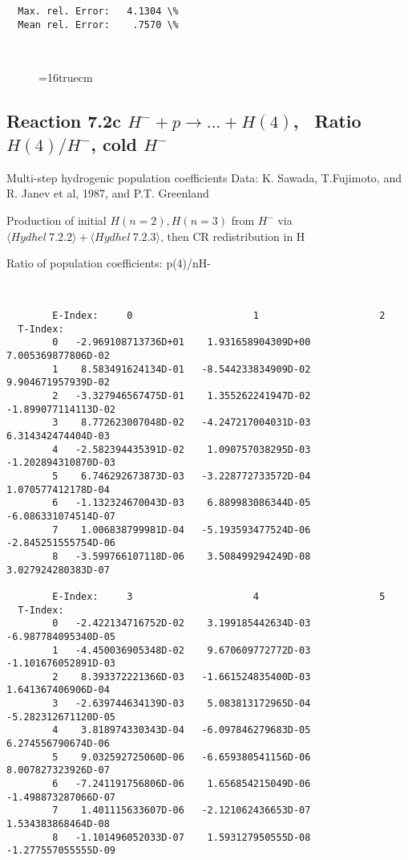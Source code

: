 \documentclass[12pt,dvipdfmx]{article}
\begin{document}
{\begin{small}
\begin{verbatim}
  Max. rel. Error:   4.1304 \%
  Mean rel. Error:    .7570 \%



\end{verbatim}\end{small}
\begin{figure} \label{7.2b}
\epsfxsize=16truecm
\end{figure}
\newpage

\subsection{
Reaction 7.2c $ H^- + p \rightarrow ...+ H(4) $, \   Ratio $H(4)/H^- $, cold $H^-$
}

 Multi-step hydrogenic population coefficients
 Data: K. Sawada, T.Fujimoto, \cite{kn:Sawada} and R. Janev et al, 1987, and P.T. Greenland

Production of initial $H(n=2), H(n=3)$ from $H^-$ via $ \langle Hydhel~ 7.2.2\rangle + \langle Hydhel~ 7.2.3\rangle$,
 then CR redistribution in H

 Ratio of population coefficients: p(4)/nH-

\begin{small}\begin{verbatim}


        E-Index:     0                     1                     2
  T-Index:
        0   -2.969108713736D+01    1.931658904309D+00    7.005369877806D-02
        1    8.583491624134D-01   -8.544233834909D-02    9.904671957939D-02
        2   -3.327946567475D-01    1.355262241947D-02   -1.899077114113D-02
        3    8.772623007048D-02   -4.247217004031D-03    6.314342474404D-03
        4   -2.582394435391D-02    1.090757038295D-03   -1.202894310870D-03
        5    6.746292673873D-03   -3.228772733572D-04    1.070577412178D-04
        6   -1.132324670043D-03    6.889983086344D-05   -6.086331074514D-07
        7    1.006838799981D-04   -5.193593477524D-06   -2.845251555754D-06
        8   -3.599766107118D-06    3.508499294249D-08    3.027924280383D-07

        E-Index:     3                     4                     5
  T-Index:
        0   -2.422134716752D-02    3.199185442634D-03   -6.987784095340D-05
        1   -4.450036905348D-02    9.670609772772D-03   -1.101676052891D-03
        2    8.393372221366D-03   -1.661524835400D-03    1.641367406906D-04
        3   -2.639744634139D-03    5.083813172965D-04   -5.282312671120D-05
        4    3.818974330343D-04   -6.097846279683D-05    6.274556790674D-06
        5    9.032592725060D-06   -6.659380541156D-06    8.007827323926D-07
        6   -7.241191756806D-06    1.656854215049D-06   -1.498873287066D-07
        7    1.401115633607D-06   -2.121062436653D-07    1.534383868464D-08
        8   -1.101496052033D-07    1.593127950555D-08   -1.277557055555D-09


\end{verbatim}
\end{small}}
\end{document}
